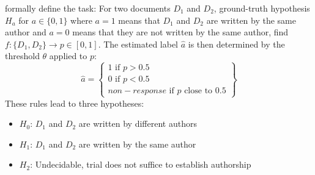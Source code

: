 \citet{boenninghoff_o2d2_2021} formally define the task:
For two documents $D_1$ and $D_2$, ground-truth hypothesis $H_a$ for $a \in \{0,1\}$ 
where $a=1$ means that $D_1$ and $D_2$ are written by the same author and 
$a=0$ means that they are not written by the same author, find $f: \{D_1, D_2\} \rightarrow p \in [0,1]$.
The estimated label $\hat{a}$ is then determined by the threshold $\theta$ applied to $p$:
$$\hat{a}=\left\{ \begin{matrix}
1\text{ if }p > 0.5 \\
0\text{ if }p < 0.5 \\
non-response\text{ if }p\text{ close to }0.5
\end{matrix}\right\}$$
These rules lead to three hypotheses:
\begin{itemize}
    \item $H_0$: $D_1$ and $D_2$ are written by different authors
    \item $H_1$: $D_1$ and $D_2$ are written by the same author
    \item $H_2$: Undecidable, trial does not suffice to establish authorship
\end{itemize}
